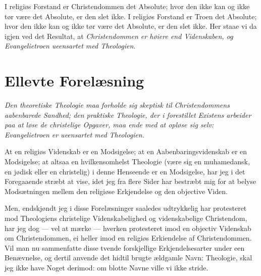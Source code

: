 \documentclass[12pt,a4paper]{book}
\newcommand{\opage}[1]{\marginnote{\footnotesize\textit{[#1]}}}
\begin{document}
I religiøs Forstand er Christendommen det Absolute; hvor den ikke kan og
ikke tør være det Absolute, er den slet ikke. I religiøs Forstand er Troen
det Absolute; hvor den ikke kan og ikke tør være det Absolute, er den slet
ikke. Her staae vi da igjen ved det Resultat,
at \emph{Christendommen er høiere end Videnskaben, og Evangelietroen
ueensartet med Theologien.}

\chapter*{Ellevte Forelæsning}
\label{ch:forel11}

\begin{center}\itshape
Den theoretiske Theologie maa forholde sig skeptisk til Christendommens
aabenbarede Sandhed; den praktiske Theologie, der i forestillet Existens
arbeider paa at løse de christelige Opgaver, maa ende med at opløse sig
selv: Evangelietroen er ueensartet med Theologien.
\end{center}

\opage{144} %
At en religiøs Videnskab er en Modsigelse; at en Aabenbaringsvidenskab er en
Modsigelse; at altsaa en hvilkensomhelst Theologie (være sig en muhamedansk,
en jødisk eller en christelig) i denne Henseende er en Modsigelse, har jeg i det
Foregaaende stræbt at vise, idet jeg fra flere Sider har bestræbt mig for at
belyse Modsætningen mellem den religiøse Erkjendelse og den objective Viden.

Men, endskjøndt jeg i disse Forelæsninger saaledes udtrykkelig har protesteret
mod Theologiens christelige Videnskabelighed og videnskabelige Christendom, har
jeg dog --- vel at mærke --- hverken protesteret imod en objectiv Videnskab om
Christendommen, ei heller imod en religiøs Erkiendelse af Christendommen. Vil
man nu sammenfatte disse tvende forskjellige Erkjendelsesarter under een
Benævnelse, og dertil anvende det hidtil brugte ældgamle Navn: Theologie, skal
jeg ikke have Noget derimod: om blotte Navne ville vi ikke stride.
\end{document}
